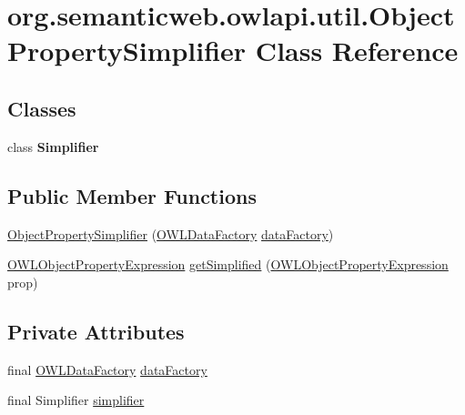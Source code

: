 \hypertarget{classorg_1_1semanticweb_1_1owlapi_1_1util_1_1_object_property_simplifier}{\section{org.\-semanticweb.\-owlapi.\-util.\-Object\-Property\-Simplifier Class Reference}
\label{classorg_1_1semanticweb_1_1owlapi_1_1util_1_1_object_property_simplifier}
}
\subsection*{Classes}
\begin{DoxyCompactItemize}
\item 
class {\bfseries Simplifier}
\end{DoxyCompactItemize}
\subsection*{Public Member Functions}
\begin{DoxyCompactItemize}
\item 
\hyperlink{classorg_1_1semanticweb_1_1owlapi_1_1util_1_1_object_property_simplifier_a201450c1f7b06d23d504fb9b16f9fe7a}{Object\-Property\-Simplifier} (\hyperlink{interfaceorg_1_1semanticweb_1_1owlapi_1_1model_1_1_o_w_l_data_factory}{O\-W\-L\-Data\-Factory} \hyperlink{classorg_1_1semanticweb_1_1owlapi_1_1util_1_1_object_property_simplifier_a9e9e8e5d6e7804c0159f9f05b4c19c66}{data\-Factory})
\item 
\hyperlink{interfaceorg_1_1semanticweb_1_1owlapi_1_1model_1_1_o_w_l_object_property_expression}{O\-W\-L\-Object\-Property\-Expression} \hyperlink{classorg_1_1semanticweb_1_1owlapi_1_1util_1_1_object_property_simplifier_ac70bcd8f84ca95b81e98a4ee4cd04208}{get\-Simplified} (\hyperlink{interfaceorg_1_1semanticweb_1_1owlapi_1_1model_1_1_o_w_l_object_property_expression}{O\-W\-L\-Object\-Property\-Expression} prop)
\end{DoxyCompactItemize}
\subsection*{Private Attributes}
\begin{DoxyCompactItemize}
\item 
final \hyperlink{interfaceorg_1_1semanticweb_1_1owlapi_1_1model_1_1_o_w_l_data_factory}{O\-W\-L\-Data\-Factory} \hyperlink{classorg_1_1semanticweb_1_1owlapi_1_1util_1_1_object_property_simplifier_a9e9e8e5d6e7804c0159f9f05b4c19c66}{data\-Factory}
\item 
final Simplifier \hyperlink{classorg_1_1semanticweb_1_1owlapi_1_1util_1_1_object_property_simplifier_a26779a7a92ae72f1001d5c95eb54041d}{simplifier}
\end{DoxyCompactItemize}


